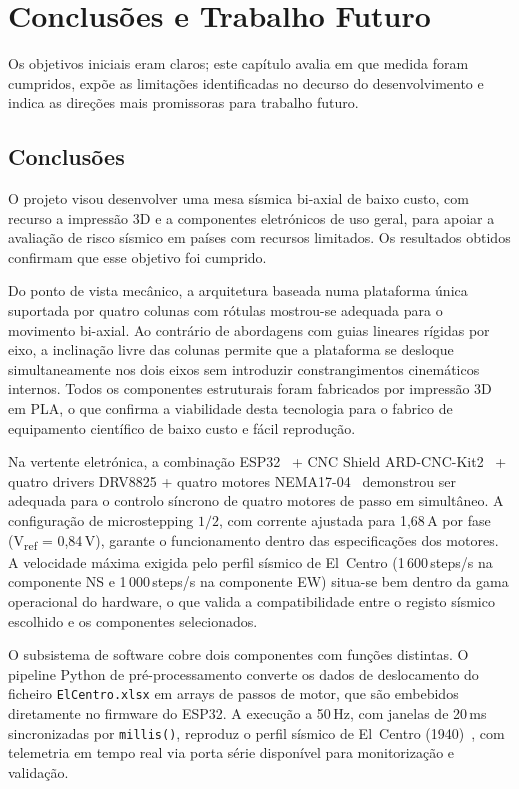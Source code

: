 \chapter{Conclusões e Trabalho Futuro}
\label{chapter:conclusions}

\begin{introduction}
Os objetivos iniciais eram claros; este capítulo avalia em que medida foram cumpridos, expõe as limitações identificadas no decurso do desenvolvimento e indica as direções mais promissoras para trabalho futuro.
\end{introduction}

\section{Conclusões}
\label{sec:conclusoes}

O projeto visou desenvolver uma mesa sísmica bi-axial de baixo custo, com recurso a impressão 3D e a componentes eletrónicos de uso geral, para apoiar a avaliação de risco sísmico em países com recursos limitados. Os resultados obtidos confirmam que esse objetivo foi cumprido.

Do ponto de vista mecânico, a arquitetura baseada numa plataforma única suportada por quatro colunas com rótulas mostrou-se adequada para o movimento bi-axial. Ao contrário de abordagens com guias lineares rígidas por eixo, a inclinação livre das colunas permite que a plataforma se desloque simultaneamente nos dois eixos sem introduzir constrangimentos cinemáticos internos. Todos os componentes estruturais foram fabricados por impressão 3D em PLA, o que confirma a viabilidade desta tecnologia para o fabrico de equipamento científico de baixo custo e fácil reprodução.

Na vertente eletrónica, a combinação ESP32~\cite{JoyITESP32} + CNC Shield ARD-CNC-Kit2~\cite{JoyITCNCKit2} + quatro drivers DRV8825 + quatro motores NEMA17-04~\cite{JoyITNEMA17} demonstrou ser adequada para o controlo síncrono de quatro motores de passo em simultâneo. A configuração de microstepping $1/2$, com corrente ajustada para 1,68\,A por fase (V\textsubscript{ref} = 0,84\,V), garante o funcionamento dentro das especificações dos motores. A velocidade máxima exigida pelo perfil sísmico de El~Centro (1\,600\,steps/s na componente NS e 1\,000\,steps/s na componente EW) situa-se bem dentro da gama operacional do hardware, o que valida a compatibilidade entre o registo sísmico escolhido e os componentes selecionados.

O subsistema de software cobre dois componentes com funções distintas. O pipeline Python de pré-processamento converte os dados de deslocamento do ficheiro \texttt{ElCentro.xlsx} em arrays de passos de motor, que são embebidos diretamente no firmware do ESP32. A execução a 50\,Hz, com janelas de 20\,ms sincronizadas por \texttt{millis()}, reproduz o perfil sísmico de El~Centro (1940)~\cite{ElCentro1940}, com telemetria em tempo real via porta série disponível para monitorização e validação.


